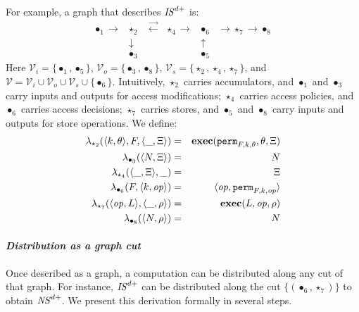 \documentclass[10pt]{article}
\newcommand{\func}[1]{{\bf #1}}
\newcommand{\op}{{\it op}}
\newcommand{\tup}[1]{\langle #1\rangle}
\newcommand{\longrightleftarrows}{\overrightarrow\longleftarrow~~}
\begin{document}
For example, a graph that describes ${\it IS}^{d+}$ is:
\[
\left.
\begin{array}{lcccr}
\bullet_1 \longrightarrow & \star_2 & \longrightleftarrows \star_4 \longrightarrow & \bullet_6 & \longrightarrow \star_7 \longrightarrow \bullet_8\\
& \downarrow & & \uparrow\\
& \bullet_3 & & \bullet_5
\end{array}
\right.
\]
Here $\mathcal V_i = \{\bullet_1,\bullet_5\}$, $\mathcal V_o = \{\bullet_3,\bullet_8\}$, $\mathcal V_s = \{\star_2,\star_4,\star_7\}$, and $\mathcal V = \mathcal V_i \cup \mathcal V_o \cup \mathcal V_s \cup \{\bullet_6\}$. Intuitively, $\star_2$ carries accumulators, and $\bullet_1$ and $\bullet_3$ carry inputs and outputs for access modifications; $\star_4$ carries access policies, and $\bullet_6$ carries access decisions; $\star_7$ carries stores, and $\bullet_5$ and $\bullet_8$ carry inputs and outputs for store operations. We define: \begin{eqnarray*}
\lambda_{\star_2}(\tup{k,\theta},F,\tup{\_,\Xi}) & = & \func{exec}(\mathtt{perm}_{F,k,\theta},\theta,\Xi) \\
\lambda_{\bullet_3}(\tup{N,\Xi}) & = & N \\
\lambda_{\star_4}(\tup{\_,\Xi},\_) & = & \Xi \\
\lambda_{\bullet_6}(F,\tup{k,\op}) & = & \tup{\op,\mathtt{perm}_{F,k,\op}} \\
\lambda_{\star_7}(\tup{\op,L},\tup{\_,\rho}) & = & \func{exec}(L,\op,\rho) \\
\lambda_{\bullet_8}(\tup{N,\rho}) & = & N 
\end{eqnarray*}


\paragraph{\em Distribution as a graph cut}
\noindent
Once described as a graph, a computation can be distributed along any cut of that graph. For instance, ${\it IS}^{d+}$ can be distributed along the cut $\{(\bullet_6,\star_7)\}$ to obtain ${\it NS}^{d+}$. We present this derivation formally in several steps. 
\end{document}
